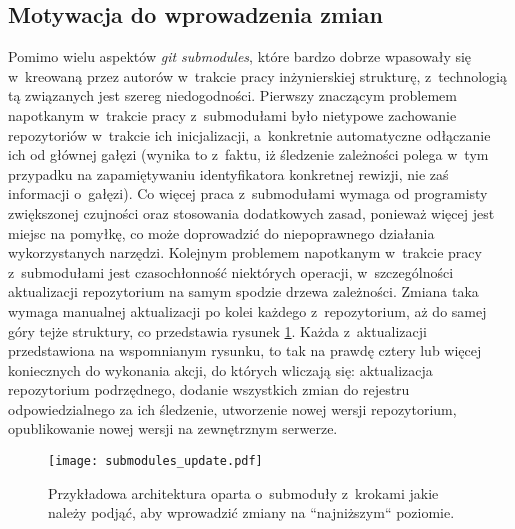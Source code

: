 

\subsection{Motywacja do wprowadzenia zmian}
Pomimo wielu aspektów \emph{git submodules}, które bardzo dobrze wpasowały się w~kreowaną przez autorów w~trakcie pracy inżynierskiej strukturę, z~technologią tą związanych jest szereg niedogodności. Pierwszy znaczącym problemem napotkanym w~trakcie pracy z~submodułami było nietypowe zachowanie repozytoriów w~trakcie ich inicjalizacji, a~konkretnie automatyczne odłączanie ich od głównej gałęzi (wynika to z~faktu, iż śledzenie zależności polega w~tym przypadku na zapamiętywaniu identyfikatora konkretnej rewizji, nie zaś informacji o~gałęzi). Co więcej praca z~submodułami wymaga od programisty zwiększonej czujności oraz stosowania dodatkowych zasad, ponieważ więcej jest miejsc na pomyłkę, co może doprowadzić do niepoprawnego działania wykorzystanych narzędzi. Kolejnym problemem napotkanym w~trakcie pracy z~submodułami jest czasochłonność niektórych operacji, w~szczególności aktualizacji repozytorium na samym spodzie drzewa zależności. Zmiana taka wymaga manualnej aktualizacji po kolei każdego z~repozytorium, aż do samej góry tejże struktury, co przedstawia rysunek \ref {fig:submodules_update}. Każda z~aktualizacji przedstawiona na wspomnianym rysunku, to tak na prawdę cztery lub więcej koniecznych do wykonania akcji, do których wliczają się: aktualizacja repozytorium podrzędnego, dodanie wszystkich zmian do rejestru odpowiedzialnego za ich śledzenie, utworzenie nowej wersji repozytorium, opublikowanie nowej wersji na zewnętrznym serwerze.

\begin{figure}[H]
    \centering
    \texttt{[image: submodules\_update.pdf]}
    \caption{Przykładowa architektura oparta o~submoduły z~krokami jakie należy podjąć, aby wprowadzić zmiany na ``najniższym`` poziomie.}
    \label{fig:submodules_update}
\end{figure}


